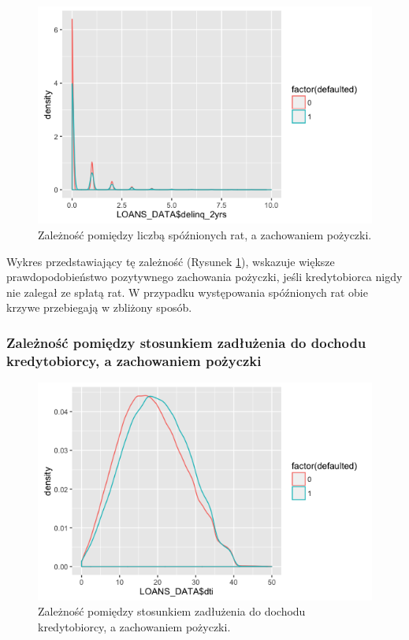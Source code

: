\begin{figure}[h] \centering %
	\includegraphics[scale=0.7]{img/delinq_defaulted.png}
	\caption{Zależność pomiędzy liczbą spóźnionych rat, a zachowaniem pożyczki.}
	\label{lc:delinq_defaulted}
\end{figure}

Wykres przedstawiający tę zależność (Rysunek \ref{lc:delinq_defaulted}), wskazuje większe prawdopodobieństwo pozytywnego zachowania pożyczki, jeśli kredytobiorca nigdy nie zalegał ze spłatą rat. W przypadku występowania spóźnionych rat obie krzywe przebiegają w zbliżony sposób.

\subsubsection{Zależność pomiędzy stosunkiem zadłużenia do dochodu kredytobiorcy, a zachowaniem pożyczki}

\begin{figure}[H] \centering %
	\includegraphics[scale=0.7]{img/dti_defaulted.png}
	\caption{Zależność pomiędzy stosunkiem zadłużenia do dochodu kredytobiorcy, a zachowaniem pożyczki.}
	\label{lc:dti_defaulted}
\end{figure}

